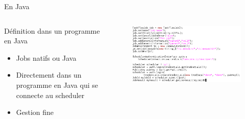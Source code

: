 \documentclass{beamer}
\begin{document}
\begin{frame}{En Java}
	\begin{columns}
	\begin{column}[l]{0.4\linewidth}
        \begin{exampleblock}{Définition dans un programme en Java}
            \begin{itemize}
                \item Jobs natifs ou Java
                \item Directement dans un programme en Java qui se connecte au scheduler
                \item Gestion fine
            \end{itemize}
        \end{exampleblock}
	\end{column}
	\begin{column}[r]{0.6\linewidth}
        \vspace{-1cm}
        \begin{figure}
            \centering
            \includegraphics[scale=0.32]{jobjava.png}
        \end{figure}
	\end{column}
	\end{columns}
    
\end{frame}
\end{document}
